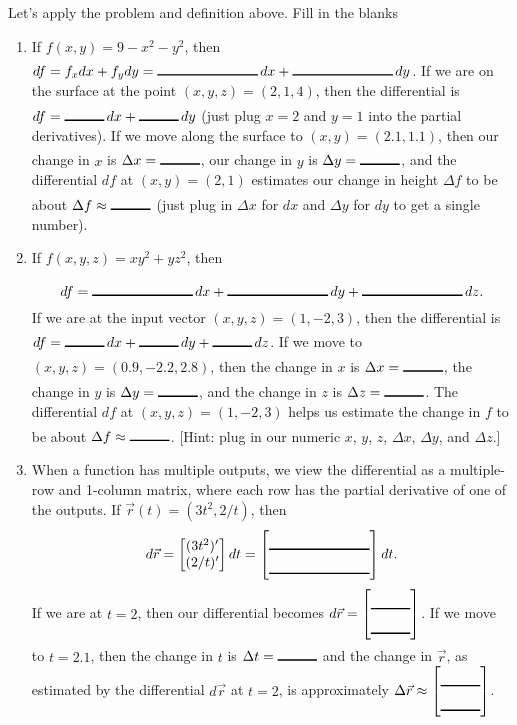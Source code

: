 \begin{problem} Let's apply the problem and definition above.  Fill in the blanks
  \begin{enumerate}
  \item If $f(x,y)=9-x^2-y^2$, then $df = f_xdx+f_ydy=\blank{1in}\,dx+\blank{1in}\,dy$.  If we are on the surface at the point $(x,y,z)=(2,1,4)$, then the differential is $df=\blank{1cm}\,dx+\blank{1cm}\,dy$ (just plug $x=2$ and $y=1$ into the partial derivatives).  If we move along the surface to $(x,y)=(2.1,1.1)$, then our change in $x$ is $\Delta x=\blank{1cm}$, our change in $y$ is $\Delta y=\blank{1cm}$, and the differential $df$ at $(x,y)=(2,1)$ estimates our change in height $\Delta f$ to be about $\Delta f\approx \blank{1cm}$ (just plug in $\Delta x$ for $dx$ and $\Delta y$ for $dy$ to get a single number).
  \item   If $f(x,y,z)=xy^2+yz^2$, then $$df = \blank{1in}\,dx+\blank{1in}\,dy+\blank{1in}\,dz.$$  If we are at the input vector $(x,y,z)=(1,-2,3)$, then the differential is $df = \blank{1cm}\,dx+\blank{1cm}\,dy+\blank{1cm}\,dz$.  If we move to $(x,y,z)=(0.9, -2.2, 2.8)$, then the change in $x$ is $\Delta x=\blank{1cm}$, the change in $y$ is $\Delta y=\blank{1cm}$, and the change in $z$ is $\Delta z=\blank{1cm}$.  The differential $df$ at $(x,y,z)=(1,-2,3)$ helps us estimate the change in $f$ to be about $\Delta f\approx \blank{1cm}$. [Hint: plug in our numeric $x$, $y$, $z$, $\Delta x$, $\Delta y$, and $\Delta z$.]
  \item When a function has multiple outputs, we view the differential as a multiple-row and 1-column matrix, where each row has the partial derivative of one of the outputs.  If $\vec r(t)=(3t^2, 2/t)$, then $$d\vec r = \begin{bmatrix}(3t^2)' \\ (2/t)'\end{bmatrix} dt=\begin{bmatrix}\blank{1in}\\\blank{1in}\end{bmatrix}dt.$$
If we are at $t=2$, then our differential becomes $d\vec r = \begin{bmatrix}\blank{1cm}\\\blank{1cm}\end{bmatrix}$.  If we move to $t=2.1$, then the change in $t$ is $\Delta t=\blank{1cm}$ and the change in $\vec r$, as estimated by the differential $d\vec r$ at $t=2$, is approximately $\Delta \vec r\approx \begin{bmatrix}\blank{1cm}\\\blank{1cm}\end{bmatrix}$.

\end{enumerate}
\end{problem}
